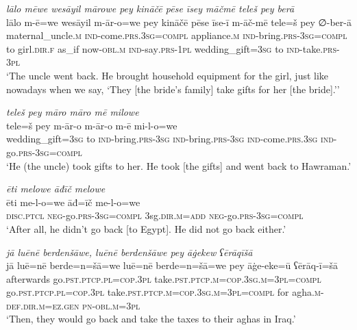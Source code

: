 \ea \label{ŽP.264}
\textit{lālo mēwe wesāyil mārowe pey kināčē pēse īsey māčmē teleš pey berā} \\ 
\gll lālo m-ē=we wesāyil m-ār-o=we pey kināčē pēse īse-ī m-āč-mē tele=š pey ∅-ber-ā \\ 
 maternal\_uncle\textsc{.m} \textsc{ind-}come\textsc{.prs}\textsc{.3sg}\textsc{=compl} appliance\textsc{.m} \textsc{ind-}bring\textsc{.prs}\textsc{-3sg}\textsc{=compl} to girl\textsc{.dir}\textsc{.f} as\_if now\textsc{-obl}\textsc{.m} \textsc{ind-}say\textsc{.prs}\textsc{-1pl} wedding\_gift\textsc{=3sg} to \textsc{ind-}take\textsc{.prs}\textsc{-3pl} \\ 
\glt `The uncle went back. He brought household equipment for the girl, just like nowadays when we say, ‘They [the bride’s family] take gifts for her [the bride].’'
\z 
 
\ea \label{ŽP.265}
\textit{teleš pey māro māro mē milowe} \\ 
\gll tele=š pey m-ār-o m-ār-o m-ē mi-l-o=we \\ 
 wedding\_gift\textsc{=3sg} to \textsc{ind-}bring\textsc{.prs}\textsc{-3sg} \textsc{ind-}bring\textsc{.prs}\textsc{-3sg} \textsc{ind-}come\textsc{.prs}\textsc{.3sg} \textsc{ind-}go\textsc{.prs}\textsc{-3sg}\textsc{=compl} \\ 
\glt `He (the uncle) took gifts to her. He took [the gifts] and went back to Hawraman.'
\z 
 
\ea \label{ŽP.266}
\textit{ēti melowe āđīč melowe} \\ 
\gll ēti me-l-o=we āđ=īč me-l-o=we \\ 
 \textsc{disc.ptcl} \textsc{neg-}go\textsc{.prs}\textsc{-3sg}\textsc{=compl} 3sg\textsc{.dir}\textsc{.m}\textsc{=add} \textsc{neg-}go\textsc{.prs}\textsc{-3sg}\textsc{=compl} \\ 
\glt `After all, he didn’t go back [to Egypt]. He did not go back either.'
\z 
 
\ea \label{BP.27}
\textit{jā luēnē berdenšāwe, luēnē berdenšāwe pey āġekew ʕērāqīšā} \\ 
\gll jā luē=nē berde=n=šā=we luē=nē berde=n=šā=we pey āġe-eke=ū ʕērāq-ī=šā \\ 
 afterwards go\textsc{.pst}\textsc{.ptcp}\textsc{.pl}\textsc{=cop}\textsc{.3pl} take\textsc{.pst}\textsc{.ptcp}\textsc{.m}\textsc{=cop}\textsc{.3sg}\textsc{.m}\textsc{=3pl}\textsc{=compl} go\textsc{.pst}\textsc{.ptcp}\textsc{.pl}\textsc{=cop}\textsc{.3pl} take\textsc{.pst}\textsc{.ptcp}\textsc{.m}\textsc{=cop}\textsc{.3sg}\textsc{.m}\textsc{=3pl}\textsc{=compl} for agha\textsc{.m}\textsc{-def}\textsc{.dir}\textsc{.m}\textsc{=ez.gen} \textsc{pn}\textsc{-obl}\textsc{.m}\textsc{=3pl} \\ 
\glt `Then, they would go back and take the taxes to their aghas in Iraq.'
\z 
 
